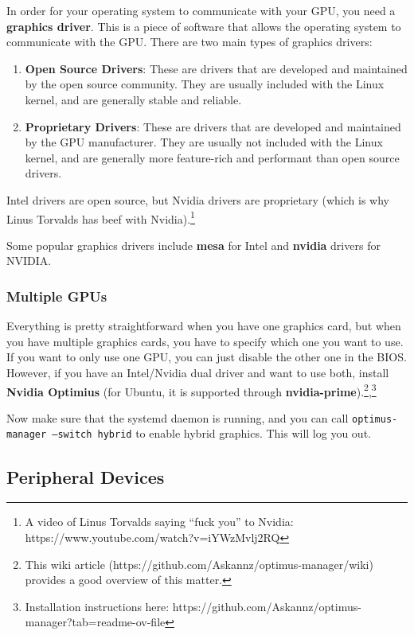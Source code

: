  \begin{definition}
    In order for your operating system to communicate with your GPU, you need a \textbf{graphics driver}. This is a piece of software that allows the operating system to communicate with the GPU. There are two main types of graphics drivers:
    \begin{enumerate} 
      \item \textbf{Open Source Drivers}: These are drivers that are developed and maintained by the open source community. They are usually included with the Linux kernel, and are generally stable and reliable. 
      \item \textbf{Proprietary Drivers}: These are drivers that are developed and maintained by the GPU manufacturer. They are usually not included with the Linux kernel, and are generally more feature-rich and performant than open source drivers. 
    \end{enumerate}
  Intel drivers are open source, but Nvidia drivers are proprietary (which is why Linus Torvalds has beef with Nvidia).\footnote{A video of Linus Torvalds saying ``fuck you'' to Nvidia: https://www.youtube.com/watch?v=iYWzMvlj2RQ}
  \end{definition}

  Some popular graphics drivers include \textbf{mesa} for Intel and \textbf{nvidia} drivers for NVIDIA. 

  \subsubsection{Multiple GPUs} 

    Everything is pretty straightforward when you have one graphics card, but when you have multiple graphics cards, you have to specify which one you want to use. If you want to only use one GPU, you can just disable the other one in the BIOS. However, if you have an Intel/Nvidia dual driver and want to use both, install \textbf{Nvidia Optimius} (for Ubuntu, it is supported through \textbf{nvidia-prime}).\footnote{This wiki article (https://github.com/Askannz/optimus-manager/wiki) provides a good overview of this matter. },\footnote{Installation instructions here: https://github.com/Askannz/optimus-manager?tab=readme-ov-file} 

    Now make sure that the systemd daemon is running, and you can call \texttt{optimus-manager --switch hybrid} to enable hybrid graphics. This will log you out. 

  \subsection{Peripheral Devices} 
    
